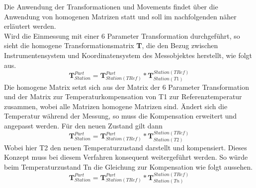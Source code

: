 Die Anwendung der Transformationen und Movements findet über die Anwendung von homogenen Matrizen statt und soll im nachfolgenden näher erläutert werden.\\
Wird die Einmessung mit einer 6 Parameter Transformation durchgeführt, so sieht die homogene Transformationsmatrix \textbf{T}, die den Bezug zwischen Instrumentensystem und Koordinatensystem des Messobjektes herstellt, wie folgt aus.
\begin{equation}\label{eq:6paramt1}
\textbf{T}_{Station}^{Part} = \textbf{T}_{Station(TRef)}^{Part} * \textbf{T}_{Station (T1)}^{Station (TRef)}
\end{equation}
Die homogene Matrix setzt sich aus der Matrix der 6 Parameter Transformation und der Matrix zur Temperaturkompensation von T1 zur Referenztemperatur zusammen, wobei alle Matrizen homogene Matrizen sind. Ändert sich die Temperatur während der Messung, so muss die Kompensation erweitert und angepasst werden. Für den neuen Zustand gilt dann
\begin{equation}\label{eq:6paramt2}
\textbf{T}_{Station}^{Part} = \textbf{T}_{Station(TRef)}^{Part} * \textbf{T}_{Station (T2)}^{Station (TRef)}
\end{equation}
Wobei hier T2 den neuen Temperaturzustand darstellt und kompensiert.
Dieses Konzept muss bei diesem Verfahren konsequent weitergeführt werden. So würde beim Temperaturzustand Tn die Gleichung zur Kompensation wie folgt aussehen.
\begin{equation}\label{eq:6paramtn}
\textbf{T}_{Station}^{Part} = \textbf{T}_{Station(TRef)}^{Part} * \textbf{T}_{Station (Tn)}^{Station (TRef)}
\end{equation}

